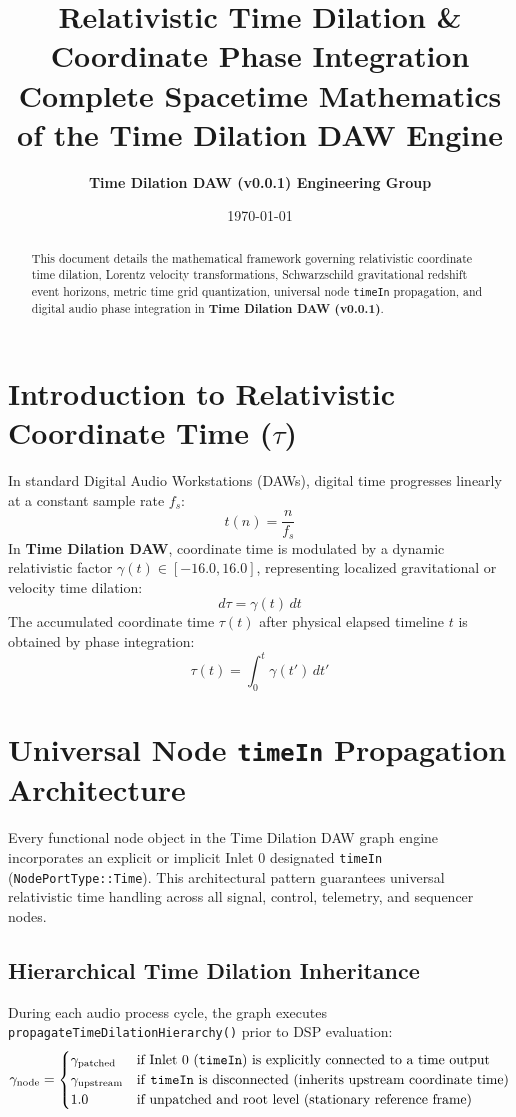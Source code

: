 \documentclass[11pt,a4paper]{article}
\title{\textbf{\Huge Relativistic Time Dilation \& Coordinate Phase Integration}\\[0.5em]
\Large Complete Spacetime Mathematics of the Time Dilation DAW Engine}
\author{\textbf{Time Dilation DAW (v0.0.1) Engineering Group}}
\date{\today}
\begin{document}
\maketitle

\begin{abstract}
This document details the mathematical framework governing relativistic coordinate time dilation, Lorentz velocity transformations, Schwarzschild gravitational redshift event horizons, metric time grid quantization, universal node \texttt{timeIn} propagation, and digital audio phase integration in \textbf{Time Dilation DAW (v0.0.1)}.
\end{abstract}

\section{Introduction to Relativistic Coordinate Time ($\tau$)}
In standard Digital Audio Workstations (DAWs), digital time progresses linearly at a constant sample rate $f_s$:
\begin{equation}
t(n) = \frac{n}{f_s}
\end{equation}
In \textbf{Time Dilation DAW}, coordinate time is modulated by a dynamic relativistic factor $\gamma(t) \in [-16.0, 16.0]$, representing localized gravitational or velocity time dilation:
\begin{equation}
d\tau = \gamma(t) \, dt
\end{equation}
The accumulated coordinate time $\tau(t)$ after physical elapsed timeline $t$ is obtained by phase integration:
\begin{equation}
\tau(t) = \int_0^t \gamma(t') \, dt'
\end{equation}

\section{Universal Node \texttt{timeIn} Propagation Architecture}
Every functional node object in the Time Dilation DAW graph engine incorporates an explicit or implicit Inlet 0 designated \texttt{timeIn} (\texttt{NodePortType::Time}). This architectural pattern guarantees universal relativistic time handling across all signal, control, telemetry, and sequencer nodes.

\subsection{Hierarchical Time Dilation Inheritance}
During each audio process cycle, the graph executes \texttt{propagateTimeDilationHierarchy()} prior to DSP evaluation:
\begin{equation}
\gamma_{\text{node}} = \begin{cases}
\gamma_{\text{patched}} & \text{if Inlet 0 (\texttt{timeIn}) is explicitly connected to a time output} \\
\gamma_{\text{upstream}} & \text{if \texttt{timeIn} is disconnected (\text{inherits upstream coordinate time})} \\
1.0 & \text{if unpatched and root level (\text{stationary reference frame})}
\end{cases}
\end{equation}
\end{document}
